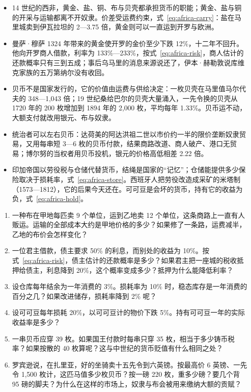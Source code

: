 \begin{takeaways}
\begin{itemize}
\item 14 世纪的西非，黄金、盐、铜、布与贝壳都承担货币的职能；黄金、盐与铜的开采与运输都离不开奴隶。价差受运费约束，式~\eqref{eq:africa-carry}：盐在马里城卖到伊瓦拉坦的 2—3.75 倍，黄金则可以一直运到开罗与欧洲。
\item 曼萨·穆萨 1324 年带来的黄金使开罗的金价至少下跌 12\%，十二年不回升。他向开罗商人借款，利率为 133\%—233\%，按式~\eqref{eq:africa-risk}，商人估计的还款概率只有三到五成；事后乌马里的消息来源说还了，伊本·赫勒敦说库维克家族的五万第纳尔没有收回。
\item 贝币不是国家发行的，它的价值由运费与供给决定：一枚贝壳在马里值马尔代夫的 348—1,043 倍；19 世纪桑给巴尔的贝壳大量涌入，一先令换的贝壳从 1720 年的 200 枚增加到 1894 年的 2,000 枚，平均每年 1.33\%。贝币运不动，大额支付就改用银元、布与奴隶。
\item 统治者可以左右贝币：达荷美的阿达洪祖二世以市价约一半的限价垄断奴隶贸易，又用每串短 3—6 枚的贝币付款，结果商路改道、商人破产、港口无贸易；博尔努的当权者用贝币投机，银元的价格高低相差 2.22 倍。
\item 印加帝国以劳役税与仓储代替货币，结绳是国家的“记忆”；仓储能提供多少保险取决于损耗率，式~\eqref{eq:africa-store}。西班牙人把劳役改造成采矿的米塔制（1573—1812），它的后果今天还在。可可豆是会坏的货币，持有它的收益为负，式~\eqref{eq:africa-hold}。
\end{itemize}
\end{takeaways}

\begin{selfcheck}
\begin{enumerate}
\item 一种布在甲地每匹卖 9 个单位，运到乙地卖 12 个单位，这条商路上一直有人贩运。运输的全部成本大约是甲地价格的多少？如果修了一条路，运费减半，乙地的布价会怎样变化？
\item 一位君主借款，债主要求 50\% 的利息，而别处的收益为 10\%。按式~\eqref{eq:africa-risk}，债主估计的还款概率是多少？如果君主把一座城的税收抵押给债主，利息降到 20\%，这个概率变成多少？抵押为什么能降低利率？
\item 设仓库每年结余为一年消费的 3\%。损耗率为 10\% 时，稳态库存是一年消费的百分之几？如果改进储存，损耗率降到 2\% 呢？
\item 设可可豆每年损耗 20\%，以可可豆计的物价下跌 5\%。持有可可豆一年的实际收益率是多少？
\item 一串贝币应穿 39 枚。如果国王付款时每串只穿 35 枚，相当于多少铸币税率？如果按散的 40 枚算呢？这与中世纪的货币贬值有什么相同之处？
\item 罗宾逊说，在扎里亚，好的坐骑卖十五先令到六英镑。按最高价 6 英镑、一先令 1,500 枚计，这匹马值多少枚贝币？按一磅 220 枚，重多少磅？要几个背 95 磅的脚夫？为什么在这样的市场上，奴隶与布会被用来缴纳大额的贡赋？
\end{enumerate}
\end{selfcheck}

